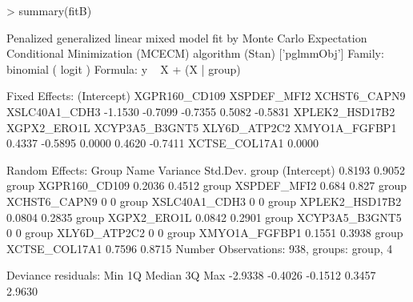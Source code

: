 \begin{example}
> summary(fitB)
\end{example}
\begin{example}
 Penalized generalized linear mixed model fit by Monte Carlo Expectation 
  Conditional Minimization (MCECM) algorithm (Stan)  ['pglmmObj'] 
  Family: binomial  ( logit )
 Formula: y ~ X + (X | group)
 
 Fixed Effects:
   (Intercept)   XGPR160_CD109     XSPDEF_MFI2    XCHST6_CAPN9   XSLC40A1_CDH3  
       -1.1530         -0.7099         -0.7355          0.5082         -0.5831 
 XPLEK2_HSD17B2     XGPX2_ERO1L  XCYP3A5_B3GNT5    XLY6D_ATP2C2   XMYO1A_FGFBP1  
        0.4337         -0.5895          0.0000          0.4620         -0.7411 
  XCTSE_COL17A1  
        0.0000  

Random Effects:
 Group Name           Variance Std.Dev.
 group (Intercept)    0.8193   0.9052  
 group XGPR160_CD109  0.2036   0.4512  
 group XSPDEF_MFI2    0.684    0.827   
 group XCHST6_CAPN9   0        0       
 group XSLC40A1_CDH3  0        0       
 group XPLEK2_HSD17B2 0.0804   0.2835  
 group XGPX2_ERO1L    0.0842   0.2901  
 group XCYP3A5_B3GNT5 0        0       
 group XLY6D_ATP2C2   0        0       
 group XMYO1A_FGFBP1  0.1551   0.3938  
 group XCTSE_COL17A1  0.7596   0.8715   
Number Observations: 938,  groups: group, 4 

Deviance residuals:  
    Min      1Q  Median      3Q     Max 
-2.9338 -0.4026 -0.1512  0.3457  2.9630
\end{example}

 


